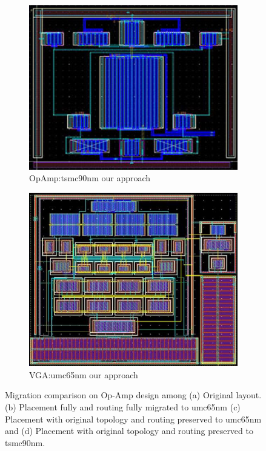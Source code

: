 \begin{figure}[ht]
\begin{subfigure}[t]{0.4\textwidth}
        \includegraphics[width=\textwidth]{Fig/PPL_OPT90.eps}
        \caption{OpAmp:tsmc90nm our approach}\label{fig:PPL_OPT90}
        \end{subfigure}
        \begin{subfigure}[t]{0.4\textwidth}
        \includegraphics[width=\textwidth]{Fig/PPL_VGAU65.eps}
        \caption{VGA:umc65nm our approach}\label{fig:PPL_VGAU65}
        \end{subfigure}
      \caption{Migration comparison on Op-Amp design among (a) Original layout. (b) Placement fully and routing fully migrated to umc65nm (c) Placement with original topology and routing preserved to umc65nm and (d) Placement with original topology and routing preserved to tsmc90nm.}\label{fig:Layout}
    \end{figure}



